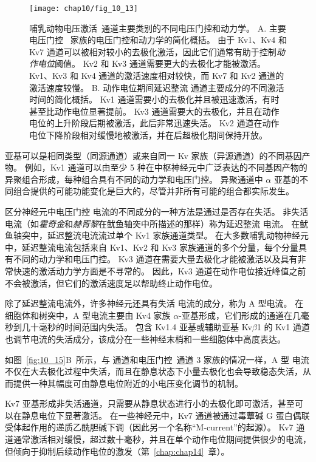 \begin{figure}[htbp]
	\centering
	\texttt{[image: chap10/fig\_10\_13]}
	\caption{哺乳动物电压激活~通道主要类别的不同电压门控和动力学。
		A. 主要电压门控~ 家族的电压门控和动力学的简化概括。
		由于 Kv1、Kv4 和 Kv7 通道可以被相对较小的去极化激活，因此它们通常有助于控制\textit{动作电位}阈值。
		Kv2 和 Kv3 通道需要更大的去极化才能被激活。
		Kv1、Kv3 和 Kv4 通道的激活速度相对较快，而 Kv7 和 Kv2 通道的激活速度较慢。
		B. 动作电位期间延迟整流  通道主要成分的不同激活时间的简化概括。
		Kv1 通道需要小的去极化并且被迅速激活，有时甚至比动作电位显著提前。
		Kv3 通道需要大的去极化，并且在动作电位的上升阶段后期被激活，此后非常迅速失活。
		Kv2 通道在动作电位下降阶段相对缓慢地被激活，并在后超极化期间保持开放\cite{johnston2010symposium}。}
	\label{fig:10_13}
\end{figure}


亚基可以是相同类型（同源通道）或来自同一 Kv 家族（异源通道）的不同基因产物。
例如，Kv1 通道可以由至少 5 种在中枢神经元中广泛表达的不同基因产物的异聚组合形成，每种组合具有不同的动力学和电压门控。
异聚通道中 $\alpha$ 亚基的不同组合提供的可能功能变化是巨大的，尽管并非所有可能的组合都实际发生。


区分神经元中电压门控  电流的不同成分的一种方法是通过是否存在失活。
非失活  电流（如\textit{霍奇金}和\textit{赫胥黎}在鱿鱼轴突中所描述的那样）称为延迟整流  电流。
在鱿鱼轴突中，延迟整流电流流过单个 Kv1 家族通道类型。
在大多数哺乳动物神经元中，延迟整流电流包括来自 Kv1、Kv2 和 Kv3 家族通道的多个分量，每个分量具有不同的动力学和电压门控。
Kv3 通道在需要大量去极化才能被激活以及具有非常快速的激活动力学方面是不寻常的。
因此，Kv3 通道在动作电位接近峰值之前不会被激活，但它们的激活速度足以帮助终止动作电位。


除了延迟整流电流外，许多神经元还具有失活  电流的成分，称为 A 型电流。
在细胞体和树突中，A 型电流主要由 Kv4 家族 $\alpha$-亚基形成，它们形成的通道在几毫秒到几十毫秒的时间范围内失活。
包含 Kv1.4 亚基或辅助亚基 Kv$\beta$1 的 Kv1 通道也调节电流的失活成分，该成分在一些神经末梢和一些细胞体中高度表达。


如图~\ref{fig:10_15}B~所示，与  通道和电压门控~通道 3 家族的情况一样，A 型  电流不仅在大去极化过程中失活，而且在静息状态下小量去极化也会导致稳态失活，从而提供一种其幅度可由静息电位附近的小电压变化调节的机制。


Kv7 亚基形成非失活通道，只需要从静息状态进行小的去极化即可激活，甚至可以在静息电位下显著激活。
在一些神经元中，Kv7 通道被通过毒蕈碱 G 蛋白偶联受体起作用的递质乙酰胆碱下调（因此另一个名称“M-current”的起源）。
Kv7 通道通常激活相对缓慢，超过数十毫秒，并且在单个动作电位期间提供很少的电流，但倾向于抑制后续动作电位的激发（第~\ref{chap:chap14}~章）。


